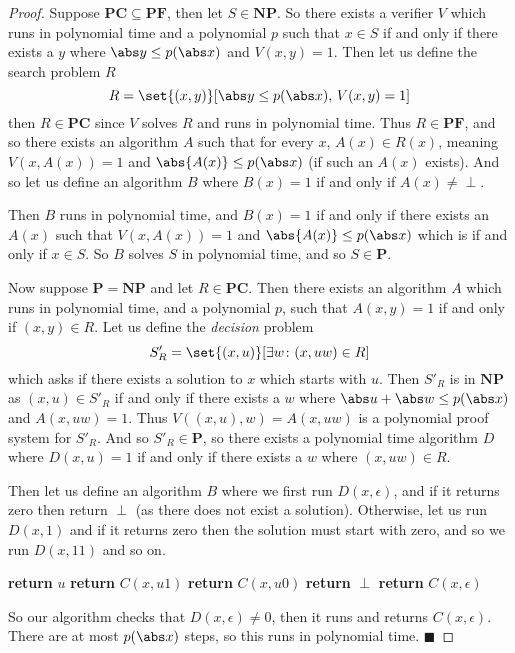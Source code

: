 \documentclass[10pt]{article}
\def\PF{\mathbf{PF}}
\def\PC{\mathbf{PC}}
\def\P{\mathbf{P}}
\def\NP{\mathbf{NP}}
\def\qed{%
    \ifmmode%
        \eqno\blacksquare%
    \else%
        \hskip1cm\allowbreak\hbox{}\nobreak\hfill$\blacksquare$%
    \fi%
}
\begin{document}
\begin{proof}

    Suppose $\PC\subseteq\PF$, then let $S\in\NP$.
    So there exists a verifier $V$ which runs in polynomial time and a polynomial $p$ such that $x\in S$ if and only if there exists a $y$ where $\abs y\leq p(\abs x)$ and $V(x,y)=1$.
    Then let us define the search problem $R$
    \[ R = \set{(x,y)}[\abs y\leq p(\abs x),\,V(x,y) = 1] \]
    then $R\in\PC$ since $V$ solves $R$ and runs in polynomial time.
    Thus $R\in\PF$, and so there exists an algorithm $A$ such that for every $x$, $A(x)\in R(x)$, meaning $V(x,A(x))=1$ and $\abs{A(x)}\leq p(\abs x)$ (if such an $A(x)$ exists).
    And so let us define an algorithm $B$ where $B(x)=1$ if and only if $A(x)\neq\perp$.

    Then $B$ runs in polynomial time, and $B(x)=1$ if and only if there exists an $A(x)$ such that $V(x,A(x))=1$ and $\abs{A(x)}\leq p(\abs x)$ which is if and only if $x\in S$.
    So $B$ solves $S$ in polynomial time, and so $S\in\P$.

    Now suppose $\P=\NP$ and let $R\in\PC$.
    Then there exists an algorithm $A$ which runs in polynomial time, and a polynomial $p$, such that $A(x,y)=1$ if and only if $(x,y)\in R$.
    Let us define the \emph{decision} problem
    \[ S'_R = \set{(x,u)}[\exists w\colon (x,uw)\in R] \]
    which asks if there exists a solution to $x$ which starts with $u$.
    Then $S'_R$ is in $\NP$ as $(x,u)\in S'_R$ if and only if there exists a $w$ where $\abs u+\abs w\leq p(\abs x)$ and $A(x,uw)=1$.
    Thus $V((x,u),w)=A(x,uw)$ is a polynomial proof system for $S'_R$.
    And so $S'_R\in\P$, so there exists a polynomial time algorithm $D$ where $D(x,u)=1$ if and only if there exists a $w$ where $(x,uw)\in R$.

    Then let us define an algorithm $B$ where we first run $D(x,\epsilon)$, and if it returns zero then return $\perp$ (as there does not exist a solution).
    Otherwise, let us run $D(x,1)$ and if it returns zero then the solution must start with zero, and so we run $D(x,11)$ and so on.

    \algorithm
                \State\textbf{return} $u$
                \State\textbf{return} $C(x,u1)$
            \Else
                \State\textbf{return} $C(x,u0)$
            \EndIf
        \EndFunc
        \State
             \textbf{return} $\perp$
            \lElse \textbf{return} $C(x,\epsilon)$
        \EndFunc
    \ealgorithm

    So our algorithm checks that $D(x,\epsilon)\neq0$, then it runs and returns $C(x,\epsilon)$.
    There are at most $p(\abs x)$ steps, so this runs in polynomial time.
    \qed
    
\end{proof}
\end{document}
